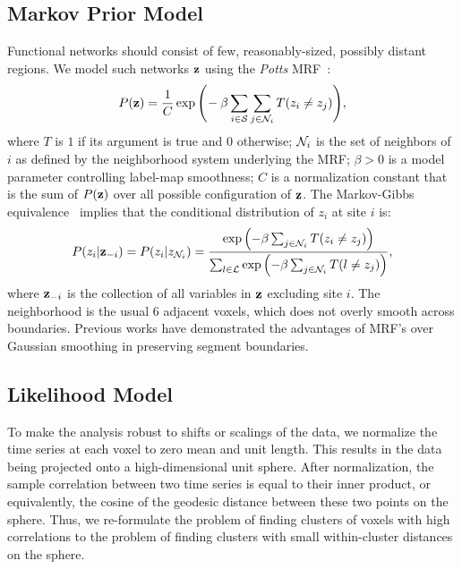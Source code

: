 \documentclass[runningheads, a4paper]{llncs}
\begin{document}
\subsection{Markov Prior Model}
Functional networks should consist of few, reasonably-sized, possibly distant
regions. We model such networks $\text{\bf z}$ using the \emph{Potts}
MRF~\cite{LiBook}:
\begin{equation*}
  P(\text{\bf z})
  =
  \frac
  {1}
  {C}
  \exp
  \Bigg(\!-\beta
  \sum_{i\in \mathcal{S}}
  \sum_{j \in \mathcal{N}_i}
  T (z_i \neq z_j)
  \Bigg),
\end{equation*}
where $T$ is $1$ if its argument is true and $0$ otherwise; $\mathcal{N}_{i}$
is the set of neighbors of $i$ as defined by the neighborhood system
underlying the MRF; $\beta > 0$ is a model parameter controlling
label-map smoothness; $C$ is a normalization constant that is the sum
of $P(\text{\bf z})$ over all possible configuration of $\text{\bf z}$. The
Markov-Gibbs equivalence~\cite{LiBook} implies that the conditional
distribution of $z_i$ at site $i$ is:
\begin{equation}
  \label{eq:mrfprior}
  P(z_i | \text{\bf z}_{-i})
  =
  P(z_i | z_{\mathcal{N}_i})
  =
  \frac
  {
    \exp \left( -\beta \sum_{j \in \mathcal{N}_i} T(z_i \neq z_j) \right)
  }
  {
    \sum_{l \in \mathcal{L}} \exp \left( -\beta \sum_{j \in \mathcal{N}_i}T(l \neq z_j) \right)
  },
\end{equation}
where $\text{\bf z}_{-i}$ is the collection of all variables in $\text{\bf z}$ excluding
site $i$. The neighborhood is the usual 6 adjacent voxels, which does not
overly smooth across boundaries. Previous works
\cite{wei1990monte,descombes_spatio-temporal_1998} have demonstrated the
advantages of MRF's over Gaussian smoothing in preserving segment boundaries.


\subsection {Likelihood Model}



To make the analysis robust to shifts or scalings of the data, we normalize the
time series at each voxel to zero mean and unit length. This results in the data
being projected onto a high-dimensional unit sphere. After normalization, the
sample correlation between two time series is equal to their inner product, or
equivalently, the cosine of the geodesic distance between these two points on
the sphere. Thus, we re-formulate the problem of finding clusters of voxels with
high correlations to the problem of finding clusters with small within-cluster
distances on the sphere.
\end{document}

